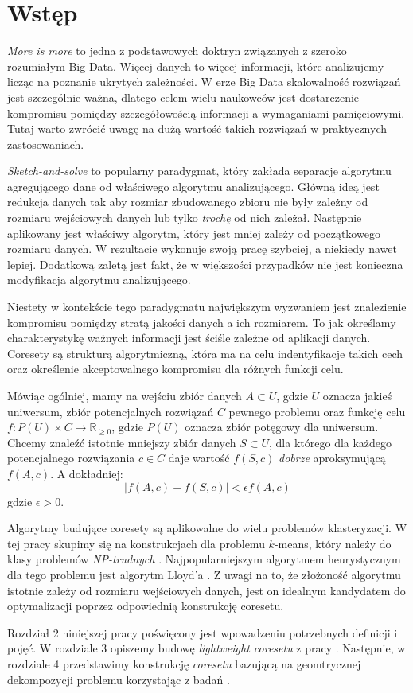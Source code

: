 \chapter{Wstęp}
\textit{More is more} to jedna z podstawowych doktryn związanych z szeroko rozumiałym Big Data.
Więcej danych to więcej informacji, które analizujemy licząc na poznanie ukrytych zależności.
W erze Big Data skalowalność rozwiązań jest szczególnie ważna, dlatego celem wielu naukowców jest dostarczenie kompromisu pomiędzy szczegółowością informacji a wymaganiami pamięciowymi.
Tutaj warto zwrócić uwagę na dużą wartość takich rozwiązań w praktycznych zastosowaniach.

\textit{Sketch-and-solve} to popularny paradygmat, który zakłada separacje algorytmu agregującego dane od właściwego algorytmu analizującego.
Główną ideą jest redukcja danych tak aby rozmiar zbudowanego zbioru nie były zależny od rozmiaru wejściowych danych lub tylko \textit{trochę} od nich zależał.
Następnie aplikowany jest właściwy algorytm, który jest mniej zależy od początkowego rozmiaru danych.
W rezultacie wykonuje swoją pracę szybciej, a niekiedy nawet lepiej.
Dodatkową zaletą jest fakt, że w większości przypadków nie jest konieczna modyfikacja algorytmu analizującego.

Niestety w kontekście tego paradygmatu największym wyzwaniem jest znalezienie kompromisu pomiędzy stratą jakości danych a ich rozmiarem.
To jak określamy charakterystykę ważnych informacji jest ściśle zależne od aplikacji danych.
Coresety są strukturą algorytmiczną, która ma na celu indentyfikacje takich cech oraz określenie akceptowalnego kompromisu dla różnych funkcji celu.

Mówiąc ogólniej, mamy na wejściu zbiór danych $A \subset U$, gdzie $U$ oznacza jakieś uniwersum, zbiór potencjalnych rozwiązań $C$ pewnego problemu oraz funkcję celu $f:P(U) \times C \rightarrow \mathbb{R}_{\geq0}$, gdzie $P(U)$ oznacza zbiór potęgowy dla uniwersum.
Chcemy znaleźć istotnie mniejszy zbiór danych $S \subset U$, dla którego dla każdego potencjalnego rozwiązania $c \in C$ daje wartość $f(S, c)$ \textit{dobrze} aproksymującą $f(A,c)$.
A dokładniej:
\begin{equation}
    |f(A,c) - f(S,c)| < \epsilon f(A,c)
\end{equation}
\noindent
gdzie $\epsilon > 0$.

Algorytmy budujące coresety są aplikowalne do wielu problemów klasteryzacji.
W tej pracy skupimy się na konstrukcjach dla problemu $k$-means, który należy do klasy problemów \textit{NP-trudnych} \cite{article}.
Najpopularniejszym algorytmem heurystycznym dla tego problemu jest algorytm Lloyd'a \cite{1056489}.
Z uwagi na to, że złożoność algorytmu istotnie zależy od rozmiaru wejściowych danych, jest on idealnym kandydatem do optymalizacji poprzez odpowiednią konstrukcję coresetu.

Rozdział 2 niniejszej pracy poświęcony jest wpowadzeniu potrzebnych definicji i pojęć.
W rozdziale 3 opiszemy budowę \textit{lightweight coresetu} z pracy \cite{bachem2017scalable}.
Następnie, w rozdziale 4 przedstawimy konstrukcję \textit{coresetu} bazującą na geomtrycznej dekompozycji problemu korzystając z badań \cite{DBLP:journals/ki/MunteanuS18}.